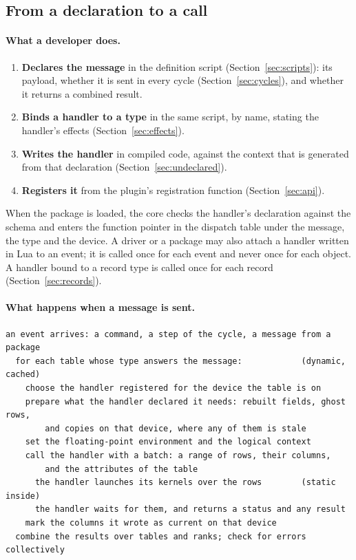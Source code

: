 \documentclass[11pt,a4paper]{article}
\begin{document}
\subsection{From a declaration to a call}
\label{sec:message-life}

\paragraph{What a developer does.}

\begin{enumerate}
  \item \textbf{Declares the message} in the definition script
        (Section~\ref{sec:scripts}): its payload, whether it is sent in
        every cycle (Section~\ref{sec:cycles}), and whether it returns a
        combined result.
  \item \textbf{Binds a handler to a type} in the same script, by name,
        stating the handler's effects (Section~\ref{sec:effects}).
  \item \textbf{Writes the handler} in compiled code, against the context
        that is generated from that declaration
        (Section~\ref{sec:undeclared}).
  \item \textbf{Registers it} from the plugin's registration function
        (Section~\ref{sec:api}).
\end{enumerate}

When the package is loaded, the core checks the handler's declaration
against the schema and enters the function pointer in the dispatch table
under the message, the type and the device.  A driver or a package may
also attach a handler written in Lua to an event; it is called once for
each event and never once for each object.  A handler bound to a record
type is called once for each record (Section~\ref{sec:records}).

\paragraph{What happens when a message is sent.}

\begin{lstlisting}
an event arrives: a command, a step of the cycle, a message from a package
  for each table whose type answers the message:            (dynamic, cached)
    choose the handler registered for the device the table is on
    prepare what the handler declared it needs: rebuilt fields, ghost rows,
        and copies on that device, where any of them is stale
    set the floating-point environment and the logical context
    call the handler with a batch: a range of rows, their columns,
        and the attributes of the table
      the handler launches its kernels over the rows        (static inside)
      the handler waits for them, and returns a status and any result
    mark the columns it wrote as current on that device
  combine the results over tables and ranks; check for errors collectively
\end{lstlisting}
\end{document}
